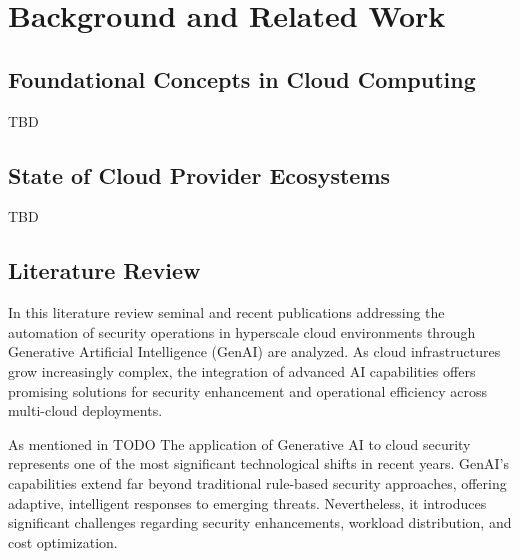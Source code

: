 
\chapter{Background and Related Work} %
\label{chap:Background and Related Work}

\section{Foundational Concepts in Cloud Computing} %
\label{sec:Foundational Concepts in Cloud Computing}

TBD


\section{State of Cloud Provider Ecosystems} %
\label{sec:State of Cloud Provider Ecosystems}

TBD


\section{Literature Review} %
\label{sec:Literature Review}


In this literature review seminal and recent publications addressing the automation of security operations in hyperscale cloud environments through Generative Artificial Intelligence (GenAI) are analyzed. As cloud infrastructures grow increasingly complex, the integration of advanced AI capabilities offers promising solutions for security enhancement and operational efficiency across multi-cloud deployments.

As mentioned in TODO The application of Generative AI to cloud security represents one of the most significant technological shifts in recent years. GenAI's capabilities extend far beyond traditional rule-based security approaches, offering adaptive, intelligent responses to emerging threats. Nevertheless, it introduces significant challenges regarding security enhancements, workload distribution, and cost optimization.


